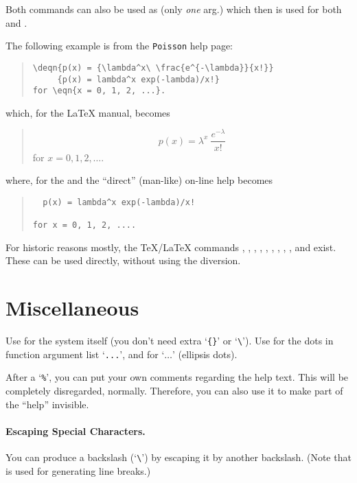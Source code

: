 Both commands can also be used as  (only
\emph{one} arg.) which then is used for both  and
.

The following example is from the \texttt{Poisson} help page:
\begin{quote}
\begin{verbatim}
\deqn{p(x) = {\lambda^x\ \frac{e^{-\lambda}}{x!}}
     {p(x) = lambda^x exp(-lambda)/x!}
for \eqn{x = 0, 1, 2, ...}.
\end{verbatim}
\end{quote}
which, for the \LaTeX{} manual, becomes
\begin{quote}
  \[ p(x) = \lambda^x\ \frac{e^{-\lambda}}{x!}  \]
  for $ x = 0, 1, 2, \ldots $.
\end{quote}
where, for the \HTML{} and the ``direct'' (man-like) on-line help
becomes
\begin{quote}
\begin{verbatim}
  p(x) = lambda^x exp(-lambda)/x!

for x = 0, 1, 2, ....
\end{verbatim}
\end{quote}

For historic reasons mostly, the \TeX/\LaTeX{} commands ,
, , , , ,
, , ,  and  exist.
These can be used directly, without using the  diversion.

\section{Miscellaneous}

Use  for the \R{} system itself (you don't need extra `\verb+{}+'
or `\verb+\+').  Use  for the dots in function argument list
`\texttt{...}', and  for `$\ldots$' (ellipsis dots).

After a `\texttt{\%}', you can put your own comments regarding the help
text. This will be completely disregarded, normally. Therefore, you can
also use it to make part of the ``help'' invisible.

\paragraph{Escaping Special Characters.}

You can produce a backslash (`\verb+\+') by escaping it by another
backslash.  (Note that  is used for generating line breaks.)

